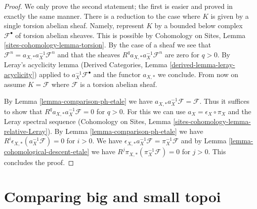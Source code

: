 \documentclass{stacks-project}
\theoremstyle{plain}
\theoremstyle{definition}
\theoremstyle{remark}
\numberwithin{equation}{subsection}
\begin{document}
\begin{proof}
We only prove the second statement; the first is easier and proved in exactly
the same manner. There is a reduction to the case where
$K$ is given by a single torsion abelian sheaf. Namely, represent $K$
by a bounded below complex $\mathcal{F}^\bullet$ of torsion
abelian sheaves. This is possible by Cohomology on Sites, Lemma
\ref{sites-cohomology-lemma-torsion}.
By the case of a sheaf we see that
$\mathcal{F}^n = a_{X, *} a_X^{-1} \mathcal{F}^n$
and that the sheaves $R^qa_{X, *}a_X^{-1}\mathcal{F}^n$
are zero for $q > 0$. By Leray's acyclicity lemma
(Derived Categories, Lemma \ref{derived-lemma-leray-acyclicity})
applied to $a_X^{-1}\mathcal{F}^\bullet$
and the functor $a_{X, *}$ we conclude. From now on assume
$K = \mathcal{F}$ where $\mathcal{F}$ is a torsion abelian sheaf.

\medskip\noindent
By Lemma \ref{lemma-comparison-ph-etale} we have
$a_{X, *}a_X^{-1}\mathcal{F} = \mathcal{F}$. Thus it suffices to show that
$R^qa_{X, *}a_X^{-1}\mathcal{F} = 0$ for $q > 0$.
For this we can use $a_X = \epsilon_X \circ \pi_X$ and
the Leray spectral sequence
(Cohomology on Sites, Lemma \ref{sites-cohomology-lemma-relative-Leray}).
By Lemma \ref{lemma-comparison-ph-etale}
we have $R^i\epsilon_{X, *}(a_X^{-1}\mathcal{F}) = 0$ for $i > 0$.
We have
$\epsilon_{X, *}a_X^{-1}\mathcal{F} = \pi_X^{-1}\mathcal{F}$
and by Lemma \ref{lemma-cohomological-descent-etale} we have
$R^j\pi_{X, *}(\pi_X^{-1}\mathcal{F}) = 0$ for $j > 0$.
This concludes the proof.
\end{proof}

\section{Comparing big and small topoi}
\label{section-compare}
\end{document}
